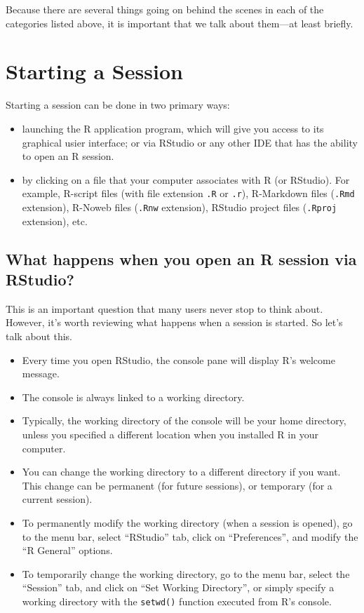 \documentclass[
]{book}
\begin{document}
Because there are several things going on behind the scenes in each of the
categories listed above, it is important that we talk about them---at least
briefly.

\hypertarget{starting-a-session}{%
\section{Starting a Session}\label{starting-a-session}}

Starting a session can be done in two primary ways:

\begin{itemize}
\item
  launching the R application program, which will give you access to its
  graphical usier interface; or via RStudio or any other IDE that has the
  ability to open an R session.
\item
  by clicking on a file that your computer associates with R (or RStudio).
  For example, R-script files (with file extension \texttt{.R} or \texttt{.r}), R-Markdown
  files (\texttt{.Rmd} extension), R-Noweb files (\texttt{.Rnw} extension), RStudio project
  files (\texttt{.Rproj} extension), etc.
\end{itemize}

\hypertarget{what-happens-when-you-open-an-r-session-via-rstudio}{%
\subsection{What happens when you open an R session via RStudio?}\label{what-happens-when-you-open-an-r-session-via-rstudio}}

This is an important question that many users never stop to think about.
However, it's worth reviewing what happens when a session is started. So let's
talk about this.

\begin{itemize}
\item
  Every time you open RStudio, the console pane will display R's welcome message.
\item
  The console is always linked to a working directory.
\item
  Typically, the working directory of the console will be your home directory,
  unless you specified a different location when you installed R in your computer.
\item
  You can change the working directory to a different directory if you want.
  This change can be permanent (for future sessions), or temporary (for a current
  session).
\item
  To permanently modify the working directory (when a session is opened), go to
  the menu bar, select ``RStudio'' tab, click on ``Preferences'', and modify the
  ``R General'' options.
\item
  To temporarily change the working directory, go to the menu bar, select the
  ``Session'' tab, and click on ``Set Working Directory'', or simply specify a
  working directory with the \texttt{setwd()} function executed from R's console.
\end{itemize}
\end{document}
